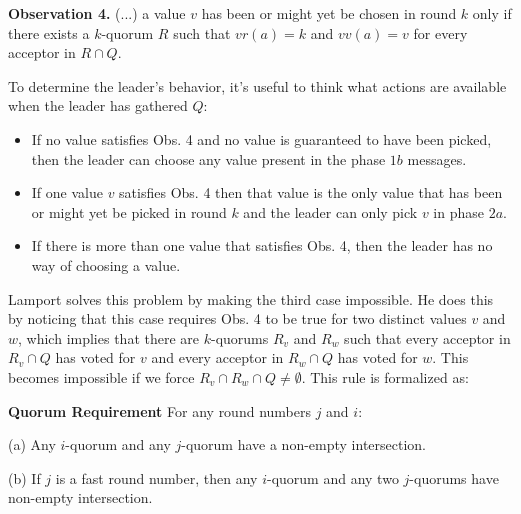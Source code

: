 \begin{displayquote}
\textbf{Observation 4.} (...) a value $v$ has been or might yet be chosen in round $k$ only if there exists a $k$-quorum $R$ such that $vr(a)=k$ and $vv(a)=v$ for every acceptor in $R \cap Q$.
\end{displayquote}

To determine the leader's behavior, it's useful to think what actions are available when the leader has gathered $Q$:
\begin{itemize}
\item If no value satisfies Obs. 4 and no value is guaranteed to have been picked, then the leader can choose any value present in the phase $1b$ messages.
\item If one value $v$ satisfies Obs. 4 then that value is the only value that has been or might yet be picked in round $k$ and the leader can only pick $v$ in phase $2a$.
\item If there is more than one value that satisfies Obs. 4, then the leader has no way of choosing a value.
\end{itemize} 

Lamport solves this problem by making the third case impossible. He does this by noticing that this case requires Obs. 4 to be true for two distinct values $v$ and $w$, which implies that there are $k$-quorums $R_v$ and $R_w$ such that every acceptor in $R_v \cap Q$ has voted for $v$ and every acceptor in $R_w \cap Q$ has voted for $w$. This becomes impossible if we force $R_v \cap R_w \cap Q \neq \emptyset$. This rule is formalized as:

\begin{displayquote}
\textbf{Quorum Requirement} For any round numbers $j$ and $i$:\par
(a) Any $i$-quorum and any $j$-quorum have a non-empty intersection.\par
(b) If $j$ is a fast round number, then any $i$-quorum and any two $j$-quorums have non-empty intersection. 	
\end{displayquote}

